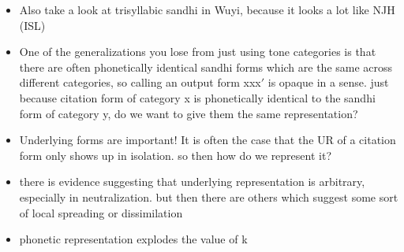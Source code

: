 \documentclass{article}
\begin{document}
\begin{itemize}
	\item Also take a look at trisyllabic sandhi in Wuyi, because it looks a lot like NJH (ISL)
	\item One of the generalizations you lose from just using tone categories is that there are often phonetically identical sandhi forms which are the same across different categories, so calling an output form xxx$'$ is opaque in a sense. just because citation form of category x is phonetically identical to the sandhi form of category y, do we want to give them the same representation? 
	\item Underlying forms are important! It is often the case that the UR of a citation form only shows up in isolation. so then how do we represent it? 
	\item there is evidence suggesting that underlying representation is arbitrary, especially in neutralization. but then there are others which suggest some sort of local spreading or dissimilation 
	\item phonetic representation explodes the value of k
\end{itemize}
\printbibliography
\end{document}
